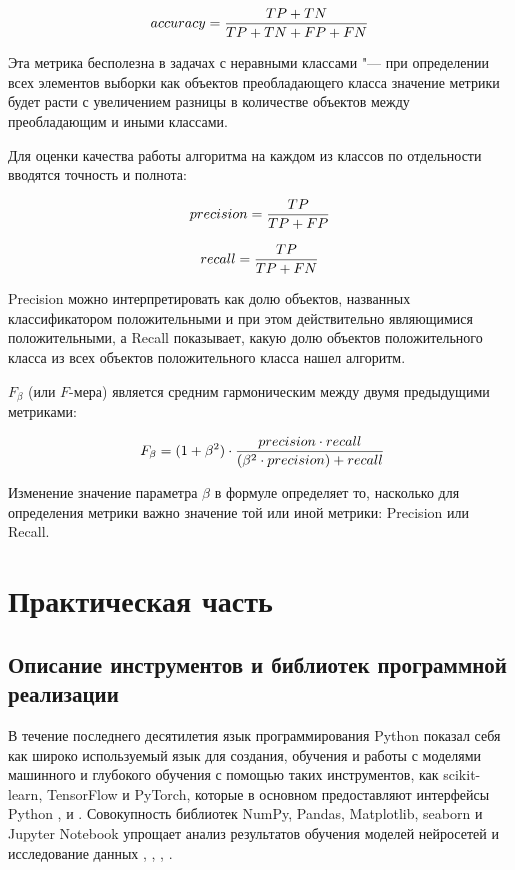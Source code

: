 \documentclass[bachelor, och, coursework]{SCWorks}
\begin{document}
        $$\large accuracy = \frac{TP + TN}{TP + TN + FP + FN}$$

        Эта метрика бесполезна в задачах с неравными классами "--- при
        определении всех элементов выборки как объектов преобладающего класса
        значение метрики будет расти с увеличением разницы в количестве объектов
        между преобладающим и иными классами.

        Для оценки качества работы алгоритма на каждом из классов по отдельности
        вводятся точность и полнота:

        $$\large precision = \frac{TP}{TP + FP}$$

        $$\large recall = \frac{TP}{TP + FN}$$

        Precision можно интерпретировать как долю объектов, названных
        классификатором положительными и при этом действительно являющимися
        положительными, а Recall показывает, какую долю объектов положительного
        класса из всех объектов положительного класса нашел алгоритм.

        $F_\beta$ (или $F$-мера) является средним гармоническим между двумя
        предыдущими метриками:

        $$\large \ F_\beta = (1 + \beta^2) \cdot \frac{precision \cdot
        recall}{(\beta^2 \cdot precision) + recall}$$

        Изменение значение параметра $\beta$ в формуле определяет то, насколько
        для определения метрики важно значение той или иной метрики: Precision
        или Recall.


\section{Практическая часть}

    \subsection{Описание инструментов и библиотек программной реализации}

        В течение последнего десятилетия язык программирования Python показал
        себя как широко используемый язык для создания, обучения и работы с
        моделями машинного и глубокого обучения с помощью таких инструментов,
        как scikit-learn, TensorFlow и PyTorch, которые в основном предоставляют
        интерфейсы Python \cite{fwtf}, \cite{fwtf} и \cite{fwpytorch}.
        Совокупность библиотек NumPy, Pandas, Matplotlib, seaborn и Jupyter
        Notebook упрощает анализ результатов обучения моделей нейросетей и
        исследование данных \cite{python}, \cite{fwnumpy}, \cite{fwpandas},
        \cite{fwjupyter}.
\end{document}
